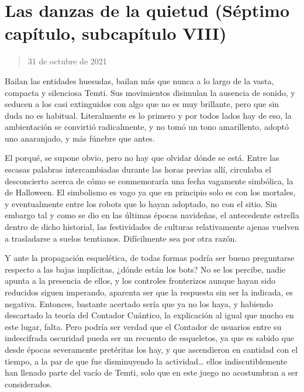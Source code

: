 \documentclass[
  spanish,
]{book}
\begin{document}
\hypertarget{las-danzas-de-la-quietud-suxe9ptimo-capuxedtulo-subcapuxedtulo-viii}{%
\section{Las danzas de la quietud (Séptimo capítulo, subcapítulo VIII)}\label{las-danzas-de-la-quietud-suxe9ptimo-capuxedtulo-subcapuxedtulo-viii}}

\begin{quote}
31 de octubre de 2021
\end{quote}

Bailan las entidades huesudas, bailan más que nunca a lo largo de la vasta, compacta y silenciosa Temti. Sus movimientos disimulan la ausencia de sonido, y seducen a los casi extinguidos con algo que no es muy brillante, pero que sin duda no es habitual. Literalmente es lo primero y por todos lados hay de eso, la ambientación se convirtió radicalmente, y no tomó un tono amarillento, adoptó uno anaranjado, y más fúnebre que antes.

El porqué, se supone obvio, pero no hay que olvidar dónde se está. Entre las escasas palabras intercambiadas durante las horas previas allí, circulaba el desconcierto acerca de cómo se conmemoraría una fecha vagamente simbólica, la de Halloween. El simbolismo es vago ya que en principio solo es con los mortales, y eventualmente entre los robots que lo hayan adoptado, no con el sitio. Sin embargo tal y como se dio en las últimas épocas navideñas, el antecedente estrella dentro de dicho historial, las festividades de culturas relativamente ajenas vuelven a trasladarse a suelos temtianos. Difícilmente sea por otra razón.

Y ante la propagación esquelética, de todas formas podría ser bueno preguntarse respecto a las bajas implícitas, ¿dónde están los bots? No se los percibe, nadie apunta a la presencia de ellos, y los controles fronterizos aunque hayan sido reducidos siguen imperando, aparenta ser que la respuesta sin ser la indicada, es negativa. Entonces, bastante acertado sería que ya no los haya, y habiendo descartado la teoría del Contador Cuántico, la explicación al igual que mucho en este lugar, falta. Pero podría ser verdad que el Contador de usuarios entre su indescifrada oscuridad pueda ser un recuento de esqueletos, ya que es sabido que desde épocas severamente pretéritas los hay, y que ascendieron en cantidad con el tiempo, a la par de que fue disminuyendo la actividad\ldots{} ellos indiscutiblemente han llenado parte del vacío de Temti, solo que en este juego no acostumbran a ser considerados.
\end{document}
